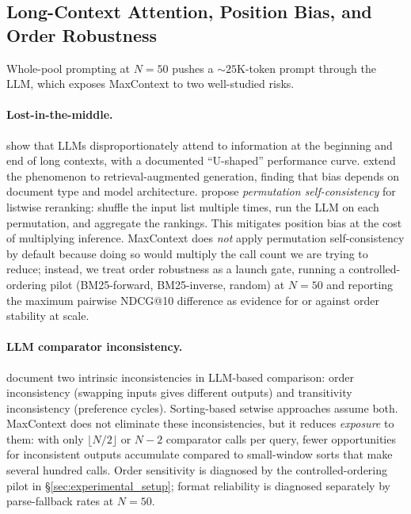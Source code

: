 \subsection{Long-Context Attention, Position Bias, and Order Robustness}
\label{ssec:rw_long_context}

Whole-pool prompting at $N{=}50$ pushes a $\sim25$K-token prompt through the
LLM, which exposes MaxContext to two well-studied risks.

\paragraph{Lost-in-the-middle.}
\citet{liu2024lostmiddle} show that LLMs disproportionately attend to
information at the beginning and end of long contexts, with a documented
``U-shaped'' performance curve. \citet{hutter2025positionalrag} extend the
phenomenon to retrieval-augmented generation, finding that bias depends on
document type and model architecture. \citet{tang2024foundmiddle} propose
\emph{permutation self-consistency} for listwise reranking: shuffle the
input list multiple times, run the LLM on each permutation, and aggregate
the rankings. This mitigates position bias at the cost of multiplying
inference. MaxContext does \emph{not} apply permutation self-consistency by
default because doing so would multiply the call count we are trying to
reduce; instead, we treat order robustness as a launch gate, running a
controlled-ordering pilot (BM25-forward, BM25-inverse, random) at
$N{=}50$ and reporting the maximum pairwise NDCG@10 difference as evidence
for or against order stability at scale.

\paragraph{LLM comparator inconsistency.}
\citet{zeng2024llmrankfusion} document two intrinsic inconsistencies in
LLM-based comparison: order inconsistency (swapping inputs gives different
outputs) and transitivity inconsistency (preference cycles). Sorting-based
setwise approaches assume both. MaxContext does not eliminate these
inconsistencies, but it reduces \emph{exposure} to them: with only
$\lfloor N/2 \rfloor$ or $N{-}2$ comparator calls per query, fewer
opportunities for inconsistent outputs accumulate compared to small-window
sorts that make several hundred calls. Order sensitivity is diagnosed by the
controlled-ordering pilot in \S\ref{sec:experimental_setup}; format
reliability is diagnosed separately by parse-fallback rates at $N{=}50$.

